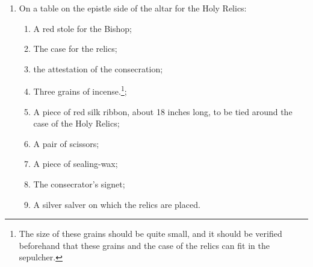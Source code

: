 \documentclass[letterpaper]{report}
\begin{document}
{\begin{enumerate}[label=\Roman*.]
\begin{enumerate}[label=\arabic*.]
                \item A small urn or tabernacle, ornamented with red silk, in
                    which the case of the relics will be placed. A silver
                    salver with a small red cloth may substitute;
                
                \item Near the altar a bier for carrying the relics;

                \item Two candlesticks.

            \end{enumerate}

        \item On a table on the epistle side of the altar for the Holy Relics:

            \begin{enumerate}[label=\arabic*.]

                \item A red stole for the Bishop;
                    
                \item The case for the relics;

                \item the attestation of the consecration;

                \item Three grains of incense.\footnote{The size of these
                    grains should be quite small, and it should be verified
                    beforehand that these grains and the case of the relics can
                    fit in the sepulcher.};

                \item A piece of red silk ribbon, about 18 inches long, to be
                    tied around the case of the Holy Relics;

                \item A pair of scissors;

                \item A piece of sealing-wax;

                \item The consecrator's signet;

                \item A silver salver on which the relics are placed.

            \end{enumerate}


\end{enumerate}}
\end{document}
